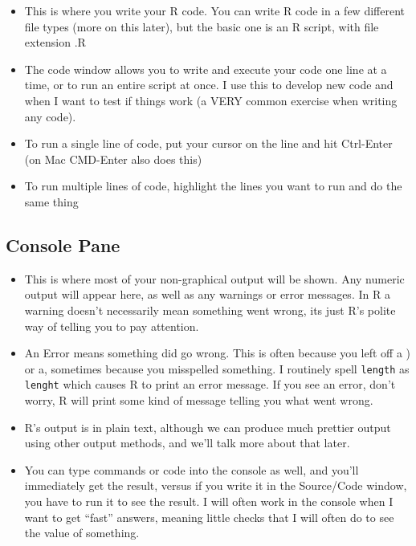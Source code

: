 \documentclass[
  letterpaper,
  DIV=11,
  numbers=noendperiod]{scrreprt}
\begin{document}
\begin{itemize}
\item
  This is where you write your R code. You can write R code in a few
  different file types (more on this later), but the basic one is an R
  script, with file extension .R
\item
  The code window allows you to write and execute your code one line at
  a time, or to run an entire script at once. I use this to develop new
  code and when I want to test if things work (a VERY common exercise
  when writing any code).
\item
  To run a single line of code, put your cursor on the line and hit
  Ctrl-Enter (on Mac CMD-Enter also does this)
\item
  To run multiple lines of code, highlight the lines you want to run and
  do the same thing
\end{itemize}

\hypertarget{console-pane}{%
\subsection{Console Pane}\label{console-pane}}

\begin{itemize}
\item
  This is where most of your non-graphical output will be shown. Any
  numeric output will appear here, as well as any warnings or error
  messages. In R a warning doesn't necessarily mean something went
  wrong, its just R's polite way of telling you to pay attention.
\item
  An Error means something did go wrong. This is often because you left
  off a ) or a, sometimes because you misspelled something. I routinely
  spell \texttt{length} as \texttt{lenght} which causes R to print an
  error message. If you see an error, don't worry, R will print some
  kind of message telling you what went wrong.
\item
  R's output is in plain text, although we can produce much prettier
  output using other output methods, and we'll talk more about that
  later.
\item
  You can type commands or code into the console as well, and you'll
  immediately get the result, versus if you write it in the Source/Code
  window, you have to run it to see the result. I will often work in the
  console when I want to get ``fast'' answers, meaning little checks
  that I will often do to see the value of something.
\end{itemize}
\end{document}
